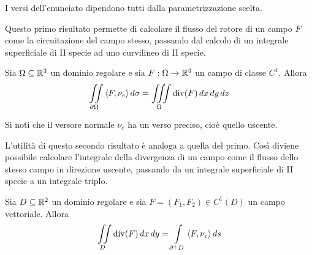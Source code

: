  \begin{oss}
     I versi dell'enunciato dipendono tutti dalla parametrizzazione scelta.
 \end{oss}
 Questo primo risultato permette di calcolare il flusso del rotore di un campo $F$ come la circuitazione del campo stesso, passando dal calcolo di un integrale superficiale di II specie ad uno curvilineo di II specie.
 \begin{theorem} \label{Teo: Teorema della divergenza}
     Sia $\Omega \subseteq \mathbb{R}^3$ un dominio regolare e sia $F: \Omega \to \mathbb{R}^3$ un campo di classe $C^1$. Allora
     \begin{equation*}
         \iint\limits_{\partial \Omega}{\langle F, \nu_e\rangle}\, d\sigma = \iiint\limits_{\Omega}{\operatorname{div}(F)}\, dx\, dy\, dz
     \end{equation*}
 \end{theorem}
 \begin{oss}
     Si noti che il versore normale $\nu_e$ ha un verso preciso, cioè quello uscente.
 \end{oss}
 L'utilità di questo secondo risultato è analoga a quella del primo. Così diviene possibile calcolare l'integrale della divergenza di un campo come il flusso dello stesso campo in direzione uscente, passando da un integrale superficiale di II specie a un integrale triplo.
 \begin{theorem}
     Sia $D \subseteq \mathbb{R}^2$ un dominio regolare e sia $F=(F_1, F_2) \in C^1(D)$ un campo vettoriale. Allora 
     \begin{equation*}
         \iint\limits_{D} {\operatorname{div}(F)}\,dx\,dy = \int\limits_{\partial^+ D}{\langle F, \nu_e \rangle}\,ds
     \end{equation*}
 \end{theorem}
